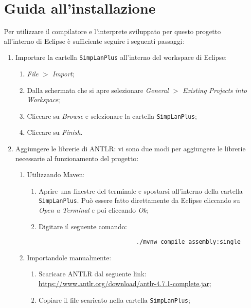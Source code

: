 \documentclass[../report.tex]{subfiles}
\begin{document}
\chapter{Guida all'installazione}\label{a:intstallazione}
Per utilizzare il compilatore e l'interprete sviluppato per questo progetto all'interno di Eclipse \`e sufficiente seguire i seguenti passaggi:
\begin{enumerate}
    \item Importare la cartella \verb|SimpLanPlus| all'interno del workspace di Eclipse:
        \begin{enumerate}
            \item \textit{File $>$ Import};
            \item Dalla schermata che si apre selezionare \textit{General $>$ Existing Projects into Workspace};
            \item Cliccare su \textit{Browse} e selezionare la cartella \verb|SimpLanPlus|;
            \item Cliccare su \textit{Finish}.
        \end{enumerate}
    \item Aggiungere le librerie di ANTLR: vi sono due modi per aggiungere le librerie necessarie al funzionamento del progetto:
        \begin{enumerate}
            \item Utilizzando Maven:
                \begin{enumerate}
                    \item Aprire una finestre del terminale e spostarsi all'interno della cartella \verb|SimpLanPlus|. Pu\`o essere fatto direttamente da Eclipse cliccando su \textit{Open a Terminal} e poi cliccando \textit{Ok};
                    \item Digitare il seguente comando:
                        \begin{lstlisting}
                            ./mvnw compile assembly:single
                        \end{lstlisting}
                \end{enumerate}
            \item Importandole manualmente:
                \begin{enumerate}
                    \item Scaricare ANTLR dal seguente link: \url{https://www.antlr.org/download/antlr-4.7.1-complete.jar};
                    \item Copiare il file scaricato nella cartella \verb|SimpLanPlus|;

\end{enumerate}
\end{enumerate}
\end{enumerate}
\end{document}
